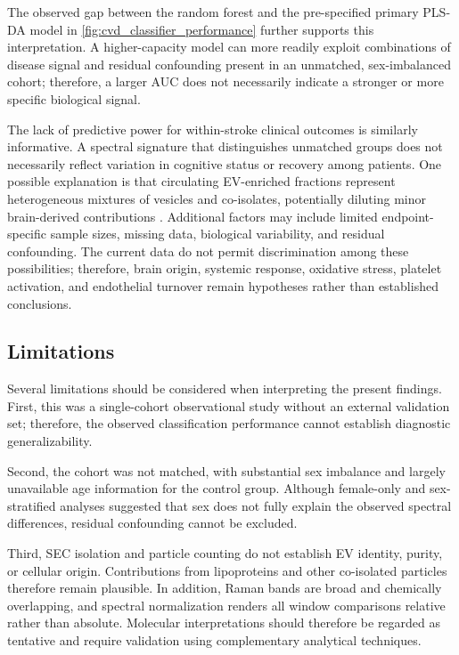 \documentclass[preprint,12pt]{elsarticle}
\begin{document}
The observed gap between the random forest and the pre-specified primary PLS-DA model in \cref{fig:cvd_classifier_performance} further supports this interpretation. A higher-capacity model can more readily exploit combinations of disease signal and residual confounding present in an unmatched, sex-imbalanced cohort; therefore, a larger AUC does not necessarily indicate a stronger or more specific biological signal.

The lack of predictive power for within-stroke clinical outcomes is similarly informative. A spectral signature that distinguishes unmatched groups does not necessarily reflect variation in cognitive status or recovery among patients. One possible explanation is that circulating EV-enriched fractions represent heterogeneous mixtures of vesicles and co-isolates, potentially diluting minor brain-derived contributions \cite{liu2025}. Additional factors may include limited endpoint-specific sample sizes, missing data, biological variability, and residual confounding. The current data do not permit discrimination among these possibilities; therefore, brain origin, systemic response, oxidative stress, platelet activation, and endothelial turnover remain hypotheses rather than established conclusions.


\subsection{Limitations} 
\label{subsec:limitations}

Several limitations should be considered when interpreting the present findings. First, this was a single-cohort observational study without an external validation set; therefore, the observed classification performance cannot establish diagnostic generalizability.

Second, the cohort was not matched, with substantial sex imbalance and largely unavailable age information for the control group. Although female-only and sex-stratified analyses suggested that sex does not fully explain the observed spectral differences, residual confounding cannot be excluded.

Third, SEC isolation and particle counting do not establish EV identity, purity, or cellular origin. Contributions from lipoproteins and other co-isolated particles therefore remain plausible. In addition, Raman bands are broad and chemically overlapping, and spectral normalization renders all window comparisons relative rather than absolute. Molecular interpretations should therefore be regarded as tentative and require validation using complementary analytical techniques.
\end{document}

